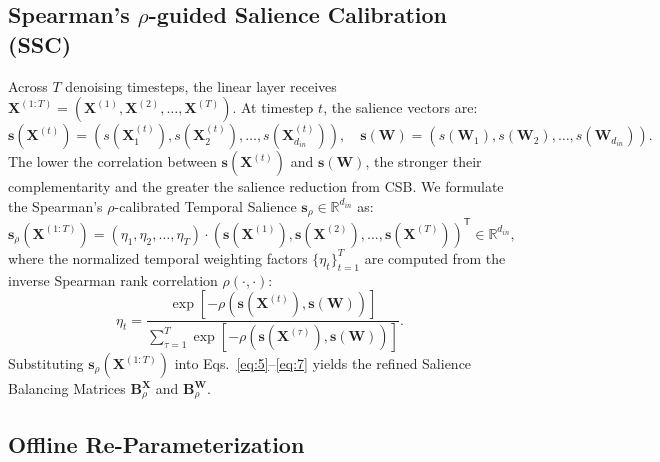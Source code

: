 \documentclass[10pt,a4paper]{article}
\begin{document}
\subsection{Spearman's $\rho$-guided Salience Calibration (SSC)}

Across $T$ denoising timesteps, the linear layer receives $\mathbf{X}^{(1:T)} = (\mathbf{X}^{(1)}, \mathbf{X}^{(2)}, \ldots, \mathbf{X}^{(T)})$. At timestep $t$, the salience vectors are:
\begin{equation}
\mathbf{s}(\mathbf{X}^{(t)}) = \left(s(\mathbf{X}_1^{(t)}), s(\mathbf{X}_2^{(t)}), \ldots, s(\mathbf{X}_{d_{in}}^{(t)})\right), \quad \mathbf{s}(\mathbf{W}) = \left(s(\mathbf{W}_1), s(\mathbf{W}_2), \ldots, s(\mathbf{W}_{d_{in}})\right).
\label{eq:9}
\end{equation}
The lower the correlation between $\mathbf{s}(\mathbf{X}^{(t)})$ and $\mathbf{s}(\mathbf{W})$, the stronger their complementarity and the greater the salience reduction from CSB. We formulate the Spearman's $\rho$-calibrated Temporal Salience $\mathbf{s}_\rho \in \mathbb{R}^{d_{in}}$ as:
\begin{equation}
\mathbf{s}_\rho(\mathbf{X}^{(1:T)}) = (\eta_1, \eta_2, \ldots, \eta_T) \cdot \left(\mathbf{s}(\mathbf{X}^{(1)}), \mathbf{s}(\mathbf{X}^{(2)}), \ldots, \mathbf{s}(\mathbf{X}^{(T)})\right)^{\mathsf{T}} \in \mathbb{R}^{d_{in}},
\label{eq:10}
\end{equation}
where the normalized temporal weighting factors $\{\eta_t\}_{t=1}^T$ are computed from the inverse Spearman rank correlation $\rho(\cdot, \cdot)$:
\begin{equation}
\eta_t = \frac{\exp\!\left[-\rho(\mathbf{s}(\mathbf{X}^{(t)}), \mathbf{s}(\mathbf{W}))\right]}{\sum_{\tau=1}^T \exp\!\left[-\rho(\mathbf{s}(\mathbf{X}^{(\tau)}), \mathbf{s}(\mathbf{W}))\right]}.
\label{eq:11}
\end{equation}
Substituting $\mathbf{s}_\rho(\mathbf{X}^{(1:T)})$ into Eqs.~\ref{eq:5}--\ref{eq:7} yields the refined Salience Balancing Matrices $\mathbf{B}_\rho^{\mathbf{X}}$ and $\mathbf{B}_\rho^{\mathbf{W}}$.

\subsection{Offline Re-Parameterization}
\end{document}
